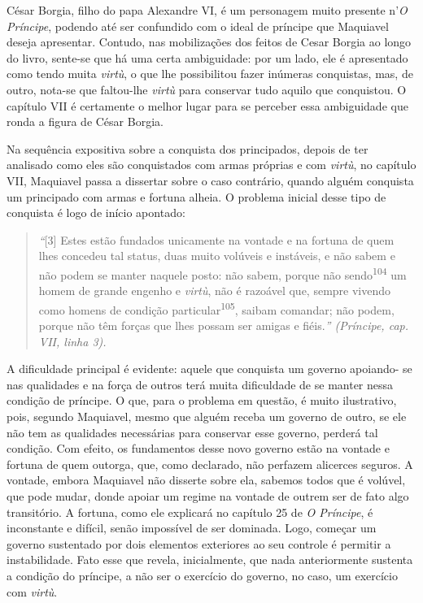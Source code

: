 César Borgia, filho do papa Alexandre VI, é um personagem muito presente
n'\emph{O Príncipe}, podendo até ser confundido com o ideal de príncipe
que Maquiavel deseja apresentar. Contudo, nas mobilizações dos feitos de
Cesar Borgia ao longo do livro, sente-se que há uma certa ambiguidade:
por um lado, ele é apresentado como tendo muita \emph{virtù}, o que lhe
possibilitou fazer inúmeras conquistas, mas, de outro, nota-se que
faltou-lhe \emph{virtù} para conservar tudo aquilo que conquistou. O
capítulo VII é certamente o melhor lugar para se perceber essa
ambiguidade que ronda a figura de César Borgia.

Na sequência expositiva sobre a conquista dos principados, depois de ter
analisado como eles são conquistados com armas próprias e com
\emph{virtù}, no capítulo VII, Maquiavel passa a dissertar sobre o caso
contrário, quando alguém conquista um principado com armas e fortuna
alheia. O problema inicial desse tipo de conquista é logo de início
apontado:

\begin{quote}
\emph{``}{[}3{]} Estes estão fundados unicamente na vontade e na fortuna
de quem lhes concedeu tal status, duas muito volúveis e instáveis, e não
sabem e não podem se manter naquele posto: não sabem, porque não
sendo\textsuperscript{104} um homem de grande engenho e \emph{virtù},
não é razoável que, sempre vivendo como homens de condição
particular\textsuperscript{105}, saibam comandar; não podem, porque não
têm forças que lhes possam ser amigas e fiéis.\emph{'' (Príncipe, cap.
VII, linha 3).}
\end{quote}

A dificuldade principal é evidente: aquele que conquista um governo
apoiando- se nas qualidades e na força de outros terá muita dificuldade
de se manter nessa condição de príncipe. O que, para o problema em
questão, é muito ilustrativo, pois, segundo Maquiavel, mesmo que alguém
receba um governo de outro, se ele não tem as qualidades necessárias
para conservar esse governo, perderá tal condição. Com efeito, os
fundamentos desse novo governo estão na vontade e fortuna de quem
outorga, que, como declarado, não perfazem alicerces seguros. A vontade,
embora Maquiavel não disserte sobre ela, sabemos todos que é volúvel,
que pode mudar, donde apoiar um regime na vontade de outrem ser de fato
algo transitório. A fortuna, como ele explicará no capítulo 25 de
\emph{O Príncipe}, é inconstante e difícil, senão impossível de ser
dominada. Logo, começar um governo sustentado por dois elementos
exteriores ao seu controle é permitir a instabilidade. Fato esse que
revela, inicialmente, que nada anteriormente sustenta a condição do
príncipe, a não ser o exercício do governo, no caso, um exercício com
\emph{virtù}.

